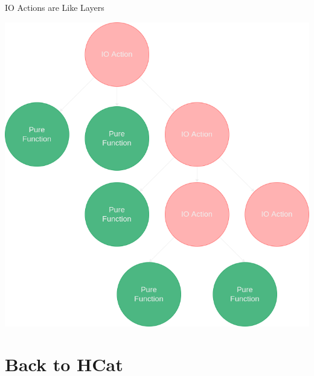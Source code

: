 \documentclass[10pt, presentation, colorlinks]{beamer}
\begin{document}
\begin{frame}[label={sec:org41f20a5}]{IO Actions are Like Layers}
\begin{center}
\includegraphics[height=0.6\textheight]{img/tree.png}
\end{center}
\end{frame}

\section{Back to HCat}
\label{sec:org7ea4465}
\end{document}
